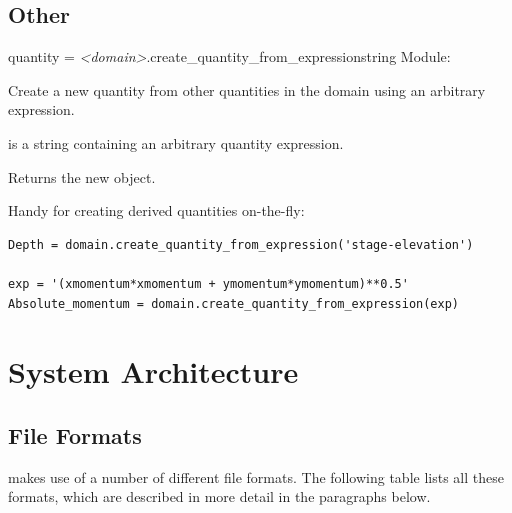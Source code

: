 \documentclass{manual}
\begin{document}
\section{Other}
\begin{methoddesc}{quantity = \emph{<domain>}.create_quantity_from_expression}{string}
Module: 

Create a new quantity from other quantities in the domain using an arbitrary expression.

 is a string containing an arbitrary quantity expression.

Returns the new  object.

Handy for creating derived quantities on-the-fly:

\begin{verbatim}
Depth = domain.create_quantity_from_expression('stage-elevation')

exp = '(xmomentum*xmomentum + ymomentum*ymomentum)**0.5'
Absolute_momentum = domain.create_quantity_from_expression(exp)
\end{verbatim}

\end{methoddesc}


\chapter{\anuga System Architecture}

\section{File Formats}
\label{sec:file formats}

\anuga makes use of a number of different file formats. The
following table lists all these formats, which are described in more
detail in the paragraphs below.
\end{document}
